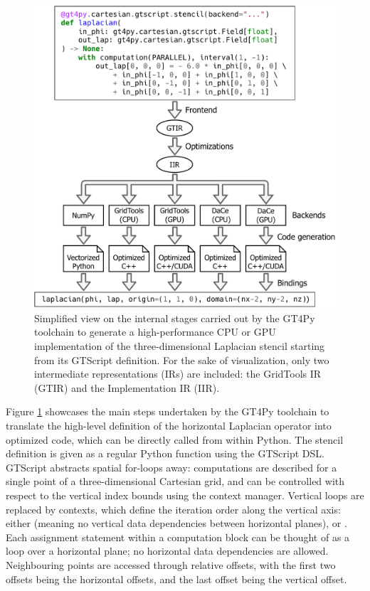 \documentclass[gmd,manuscript,online]{copernicus}
\theoremstyle{theorem}
\theoremstyle{definition}
\theoremstyle{remark}
\theoremstyle{proposition}
\begin{document}
	\begin{figure}[t!]
		\centering
		\includegraphics[scale=0.5]{gt4py_3.pdf}
		\caption{Simplified view on the internal stages carried out by the GT4Py toolchain to generate a high-performance CPU or GPU implementation of the three-dimensional Laplacian stencil starting from its GTScript definition. For the sake of visualization, only two intermediate representations (IRs) are included: the GridTools IR (GTIR) and the Implementation IR (IIR). }
		\label{fig:gt4py}
	\end{figure}

	Figure \ref{fig:gt4py} showcases the main steps undertaken by the GT4Py toolchain to translate the high-level definition of the horizontal Laplacian operator into optimized code, which can be directly called from within Python. The stencil definition is given as a regular Python function using the GTScript DSL. GTScript abstracts spatial for-loops away: computations are described for a single point of a three-dimensional Cartesian grid, and can be controlled with respect to the vertical index bounds using the  context manager. Vertical loops are replaced by  contexts, which define the iteration order along the vertical axis: either  (meaning no vertical data dependencies between horizontal planes),  or . Each assignment statement within a computation block can be thought of as a loop over a horizontal plane; no horizontal data dependencies are allowed. Neighbouring points are accessed through relative offsets, with the first two offsets being the horizontal offsets, and the last offset being the vertical offset.
\end{document}
